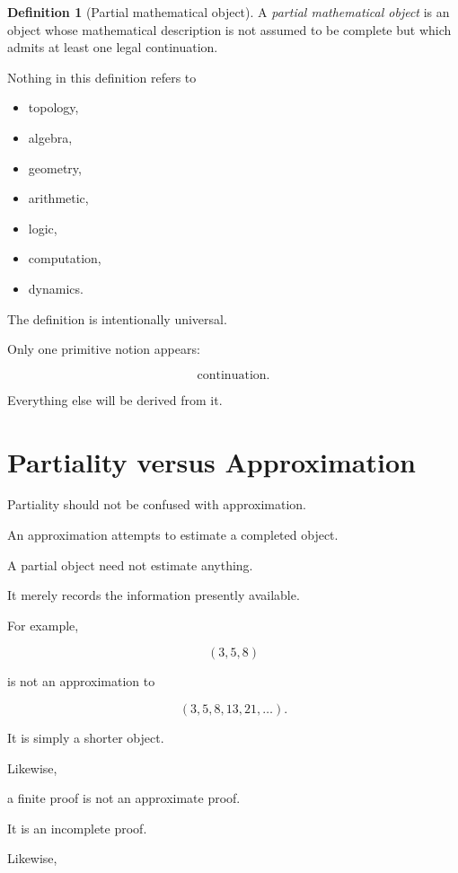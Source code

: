 \documentclass[13pt,openany]{book}
\theoremstyle{plain}
\theoremstyle{definition}
\newtheorem{definition}{Definition}[chapter]
\begin{document}
\begin{definition}[Partial mathematical object]
A \emph{partial mathematical object} is an object whose mathematical
description is not assumed to be complete but which admits at least one
legal continuation.
\end{definition}

Nothing in this definition refers to

\begin{itemize}
\item topology,
\item algebra,
\item geometry,
\item arithmetic,
\item logic,
\item computation,
\item dynamics.
\end{itemize}

The definition is intentionally universal.

Only one primitive notion appears:

\[
\boxed{\text{continuation}.}
\]

Everything else will be derived from it.

\section{Partiality versus Approximation}

Partiality should not be confused with approximation.

An approximation attempts to estimate a completed object.

A partial object need not estimate anything.

It merely records the information presently available.

For example,

\[
(3,5,8)
\]

is not an approximation to

\[
(3,5,8,13,21,\ldots).
\]

It is simply a shorter object.

Likewise,

a finite proof is not an approximate proof.

It is an incomplete proof.

Likewise,
\end{document}
